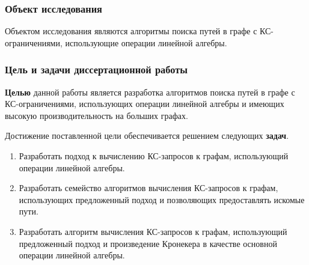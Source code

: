 
\subsubsection*{\large{Объект исследования}}

 Объектом исследования являются алгоритмы поиска путей в графе с КС-ограничениями, использующие операции линейной алгебры.

\subsubsection*{\large{Цель и задачи диссертационной работы}}

\textbf{Целью} данной работы является разработка алгоритмов поиска путей в графе с КС-ограничениями, использующих операции линейной алгебры и имеющих высокую производительность на больших графах.

Достижение поставленной цели обеспечивается решением следующих \textbf{задач}.
\begin{enumerate}
	\item Разработать подход к вычислению КС-запросов к графам, использующий операции линейной алгебры.
	\item Разработать семейство алгоритмов вычисления КС-запросов к графам, использующих предложенный подход и позволяющих предоставлять искомые пути.
	\item Разработать алгоритм вычисления КС-запросов к графам, использующий предложенный подход и произведение Кронекера в качестве основной операции линейной алгебры.
\end{enumerate}


